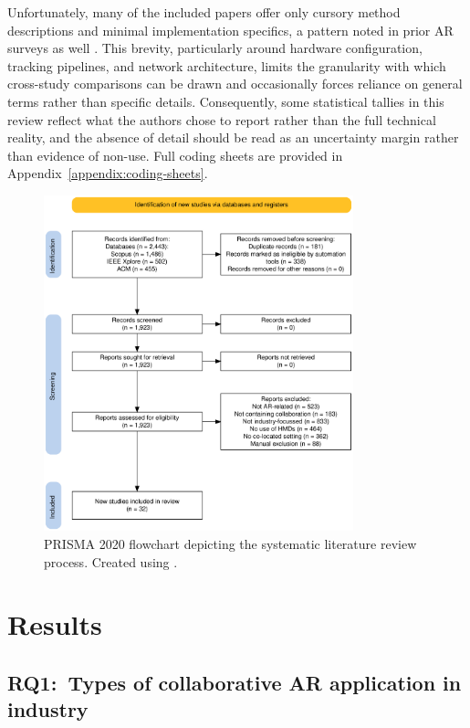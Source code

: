 Unfortunately, many of the included papers offer only cursory method descriptions and minimal implementation specifics, a pattern noted in prior AR surveys as well \cite{deSouza2020surveyIndustrialAR, de2020systematic}. This brevity, particularly around hardware configuration, tracking pipelines, and network architecture, limits the granularity with which cross-study comparisons can be drawn and occasionally forces reliance on general terms rather than specific details. Consequently, some statistical tallies in this review reflect what the authors chose to report rather than the full technical reality, and the absence of detail should be read as an uncertainty margin rather than evidence of non-use. Full coding sheets are provided in Appendix~\ref{appendix:coding-sheets}.

\begin{figure}[t!]
    \centering
    \includegraphics[width=0.8\textwidth]{assets/03/prisma.pdf}
    \caption{PRISMA 2020 flowchart depicting the systematic literature review process. Created using \cite{Haddaway2022PRISMA2020}.}
    \label{fig:prisma-flowchart}
\end{figure}

\section{Results}
\label{sec:lit-results}
\subsection{RQ1:~Types of collaborative AR application in industry}
\label{sec:lit-rq1}

